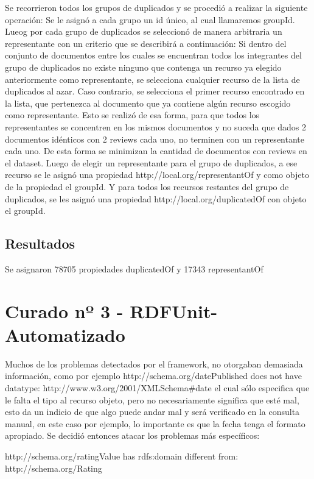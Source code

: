 Se recorrieron todos los grupos de duplicados y se procedió a realizar la siguiente operación:
Se le asignó a cada grupo un id único, al cual llamaremos groupId.
Lueog por cada grupo de duplicados se seleccionó de manera arbitraria un representante con un criterio que se describirá a continuación:
Si dentro del conjunto de documentos entre los cuales se encuentran todos los integrantes del grupo de duplicados no existe ninguno 
que contenga un recurso ya elegido anteriormente como representante, se selecciona cualquier recurso de la lista de duplicados al azar.
Caso contrario, se selecciona el primer recurso encontrado en la lista, que pertenezca al documento que ya contiene algún recurso escogido 
como representante.
Esto se realizó de esa forma, para que todos los representantes se concentren en los mismos documentos y no suceda que dados 2 
documentos idénticos con 2 reviews cada uno, no terminen con un representante cada uno. De esta forma se minimizan la cantidad de 
documentos con reviews en el dataset.
Luego de elegir un representante para el grupo de duplicados, a ese recurso se le asignó una propiedad http://local.org/representantOf y 
como objeto de la propiedad el groupId.
Y para todos los recursos restantes del grupo de duplicados, se les asignó una propiedad http://local.org/duplicatedOf con objeto 
el groupId.

\subsection*{Resultados}

Se asignaron 78705 propiedades duplicatedOf y 17343 representantOf

\section{Curado nº 3 - RDFUnit-Automatizado}
\label{section:curado-automatizado}

Muchos de los problemas detectados por el framework, no otorgaban demasiada información, como por ejemplo
http://schema.org/datePublished does not have datatype: http://www.w3.org/2001/XMLSchema\#date el cual sólo especifica que le 
falta el tipo al recurso objeto, pero no necesariamente significa que esté mal, esto da un indicio de que algo puede andar mal
y será verificado en la consulta manual, en este caso por ejemplo, lo importante es que la fecha tenga el formato apropiado.
Se decidió entonces atacar los problemas más específicos:

http://schema.org/ratingValue has rdfs:domain different from: \\\noindent http://schema.org/Rating

